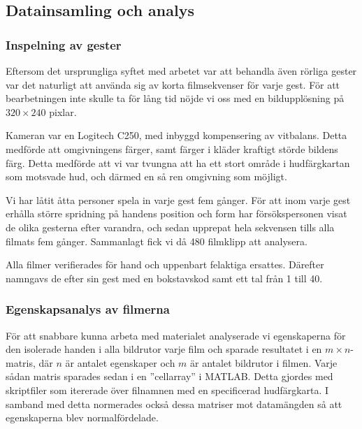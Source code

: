 \documentclass[../rapport_MVEX01-11-05]{subfiles}
\begin{document}
\subsection{Datainsamling och analys}

\subsubsection{Inspelning av gester}
Eftersom det ursprungliga syftet med arbetet var att behandla även rörliga
gester var det naturligt att använda sig av korta filmsekvenser för varje gest.
För att bearbetningen inte skulle ta för lång tid nöjde vi oss med en
bildupplösning på $320\times240$ pixlar.

Kameran var en Logitech C250, med inbyggd kompensering av vitbalans. Detta
medförde att omgivningens färger, samt färger i kläder kraftigt störde bildens 
färg. Detta medförde att vi var tvungna att ha ett stort område i hudfärgkartan
som motsvade hud, och därmed en så ren omgivning som möjligt.

Vi har låtit åtta personer spela in varje gest fem gånger.
För att inom varje gest erhålla större spridning på handens position och form
har försökspersonen visat de olika gesterna efter varandra, och sedan
upprepat hela sekvensen tills alla filmats fem gånger. Sammanlagt fick vi då 480
filmklipp att analysera.

Alla filmer verifierades för hand och uppenbart felaktiga ersattes. Därefter
namngavs de efter sin gest med en bokstavskod samt ett tal från 1 till 40.

\subsubsection{Egenskapsanalys av filmerna}
För att snabbare kunna arbeta med materialet analyserade vi
egenskaperna för den isolerade handen i alla bildrutor varje film och sparade
resultatet i en $m\times n$-matris, där $n$ är antalet egenskaper och $m$ är
antalet bildrutor i filmen. Varje sådan matris sparades sedan i en ''cellarray''
i MATLAB. Detta gjordes med skriptfiler som itererade över filnamnen
med en specificerad hudfärgkarta. I samband med detta normerades också dessa
matriser mot datamängden så att egenskaperna blev normalfördelade.
\end{document}
